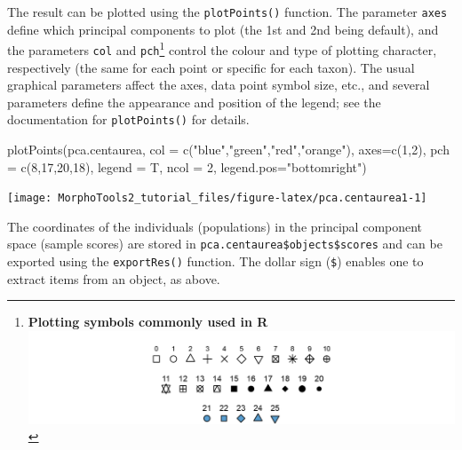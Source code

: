 \documentclass[
  11pt,
  a4paper]{article}
\newenvironment{Shaded}{\begin{snugshade}}{\end{snugshade}}
\newcommand{\AttributeTok}[1]{\textcolor[rgb]{0.77,0.63,0.00}{#1}}
\newcommand{\DecValTok}[1]{\textcolor[rgb]{0.00,0.00,0.81}{#1}}
\newcommand{\FunctionTok}[1]{\textcolor[rgb]{0.00,0.00,0.00}{#1}}
\newcommand{\NormalTok}[1]{#1}
\newcommand{\SpecialCharTok}[1]{\textcolor[rgb]{0.00,0.00,0.00}{#1}}
\newcommand{\StringTok}[1]{\textcolor[rgb]{0.31,0.60,0.02}{#1}}
\begin{document}
The result can be plotted using the \texttt{plotPoints()} function. The
parameter \texttt{axes} define which principal components to plot (the
1st and 2nd being default), and the parameters \texttt{col} and
\texttt{pch}\footnote{\textbf{Plotting symbols commonly used in R}\\
  \includegraphics[width=1\textwidth,height=\textheight]{./pch.png}}
control the colour and type of plotting character, respectively (the
same for each point or specific for each taxon). The usual graphical
parameters affect the axes, data point symbol size, etc., and several
parameters define the appearance and position of the legend; see the
documentation for \texttt{plotPoints()} for details.

\begin{Shaded}
\begin{Highlighting}[]
\FunctionTok{plotPoints}\NormalTok{(pca.centaurea, }\AttributeTok{col =} \FunctionTok{c}\NormalTok{(}\StringTok{"blue"}\NormalTok{,}\StringTok{"green"}\NormalTok{,}\StringTok{"red"}\NormalTok{,}\StringTok{"orange"}\NormalTok{), }\AttributeTok{axes=}\FunctionTok{c}\NormalTok{(}\DecValTok{1}\NormalTok{,}\DecValTok{2}\NormalTok{),}
           \AttributeTok{pch =} \FunctionTok{c}\NormalTok{(}\DecValTok{8}\NormalTok{,}\DecValTok{17}\NormalTok{,}\DecValTok{20}\NormalTok{,}\DecValTok{18}\NormalTok{), }\AttributeTok{legend =}\NormalTok{ T, }\AttributeTok{ncol =} \DecValTok{2}\NormalTok{, }\AttributeTok{legend.pos=}\StringTok{"bottomright"}\NormalTok{)}
\end{Highlighting}
\end{Shaded}

\begin{center}\texttt{[image: MorphoTools2\_tutorial\_files/figure-latex/pca.centaurea1-1]} \end{center}

The coordinates of the individuals (populations) in the principal
component space (sample scores) are stored in
\texttt{pca.centaurea\$objects\$scores} and can be exported using the
\texttt{exportRes()} function. The dollar sign (\texttt{\$}) enables one
to extract items from an object, as above.

\begin{Shaded}
\end{Shaded}
\end{document}
